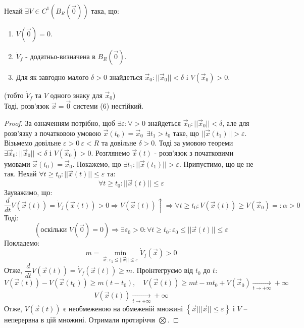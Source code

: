 \documentclass[14pt,a4paper]{scrartcl}
\theoremstyle{definition}
\theoremstyle{definition}
\theoremstyle{definition}
\begin{document}
\begin{boxteo} \ \\Нехай $\exists V \in C^{1} (B_R (\overrightarrow{0}))$ така, що:
\begin{enumerate}
  \item $V(\overrightarrow{0}) = 0$.
  \item $\dot{V}_f $ - додатньо-визначена в $B_R (\overrightarrow{0})$.
  \item Для як завгодно малого $\delta > 0 $ знайдеться $\overrightarrow{x}_0 : ||\overrightarrow{x}_0|| < \delta $ i $V (\overrightarrow{x}_0) > 0 $.
\end{enumerate}
(тобто $\dot{V}_f$ та $V$ одного знаку для $\overrightarrow{x}_0$)\\
Тоді, розв'язок $\overrightarrow{x} = \overrightarrow{0} $ системи (6) нестійкий.
\end{boxteo}

\begin{proof}
 За означенням потрібно, щоб $\exists \varepsilon : \forall > 0 $ знайдеться $\overrightarrow{x}_0 : ||\overrightarrow{x}_0|| < \delta$, але для розв'язку з початковою умовою $\overrightarrow{x}(t_0) = \overrightarrow{x}_0 \ \ \exists t_1 > t_0 $ таке, що $||\overrightarrow{x} (t_1)||>\varepsilon $. Візьмемо довільне $ \varepsilon > 0 \ \varepsilon  < R  $ та довільне $\delta > 0$. Тоді за умовою теореми $\exists \overrightarrow{x}_0 : ||\overrightarrow{x}_0|| < \delta $ і $V(\overrightarrow{x}_0) > 0$. Розглянемо $\overrightarrow{x}(t)$ - розв'язок з початковими умовами $\overrightarrow{x}(t_0) = \overrightarrow{x}_0$. Покажемо, що $\exists t_1 : ||\overrightarrow{x}(t_1)|| > \varepsilon $. Припустимо, що це не так. Нехай $\forall t \geq t_0 : ||\overrightarrow{x}(t)|| \leq \varepsilon $ та:
$$
\forall t \geq t_0 : ||\overrightarrow{x}(t)|| \leq \varepsilon
$$
Зауважимо, що:
$$
\frac{d}{dt} V(\overrightarrow{x}(t)) = \dot{V}_f (\overrightarrow{x}(t)) >0 \Longrightarrow V(\overrightarrow{x}(t)) \! \uparrow \Longrightarrow \forall t \geq t_0 : V(\overrightarrow{x}(t)) \geq  V(\overrightarrow{x}_0) =: \alpha > 0
$$
Тоді:
$$
(\text{оскільки } V(\overrightarrow{0}) = 0) \Longrightarrow \exists \varepsilon_0 >0 : \forall t \geq t_0 : \varepsilon _0 \leq ||\overrightarrow{x}(t)|| \leq \varepsilon
$$
Покладемо:$$m = \min\limits_{\overrightarrow{x} : \varepsilon_1 \leq ||\overrightarrow{x}|| \leq \varepsilon } \dot{V}_f(\overrightarrow{x}) > 0$$
Отже, $ \dfrac{d}{dt}V(\overrightarrow{x}(t))  = \dot{V}_f(\overrightarrow{x}(t)) \geq m $. Проінтегруємо від $t_0$ до $t$:
$$
V(\overrightarrow{x}(t)) - V(\overrightarrow{x}(t_0)) \geq m (t -t_0), \quad
V(\overrightarrow{x}(t)) \geq  mt - mt_0 + V(\overrightarrow{x}_0) \xrightarrow[t\to+\infty]{}+ \infty
$$
$$
V(\overrightarrow{x}(t)) \xrightarrow[t\to+\infty]{} + \infty
$$
Отже, $V(\overrightarrow{x}(t))$ є необмеженою на обмеженій множині $\left\lbrace \overrightarrow{x} \Big| ||\overrightarrow{x}|| \leq \varepsilon  \right\rbrace$ і $V$ -- неперервна в цій множині.
Отримали протиріччя $\bigotimes$.
\end{proof}
\end{document}
